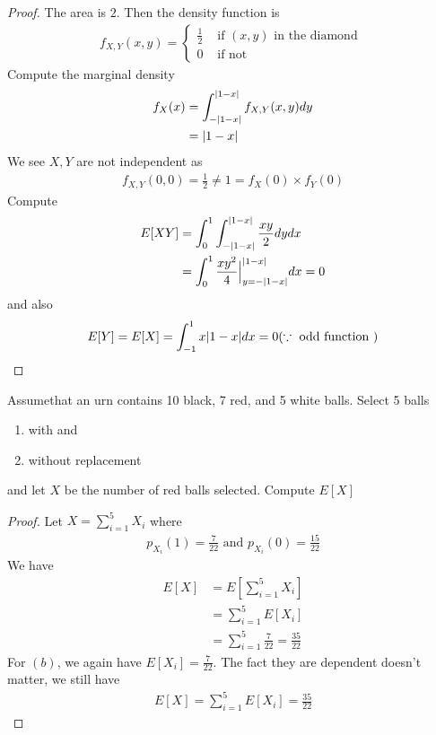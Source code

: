 \documentclass{report}
\begin{document}
\begin{proof}
The area is $2$. Then the density function is 
 \begin{align*}
f_{X,Y}(x,y)=\begin{cases}
  \frac{1}{2}& \text{ if $(x,y)$ in the diamond }\\
  0& \text{ if not }
\end{cases}
\end{align*}
Compute the marginal density 
\begin{align*}
f_X(x)&=\int_{-|1-x|}^{|1-x|} f_{X,Y}(x,y)dy\\
&=|1-x|
\end{align*}
We see $X,Y$ are not independent as 
\begin{align*}
f_{X,Y}(0,0)=\frac{1}{2}\neq 1=f_X(0)\times f_Y(0)
\end{align*}
Compute 
\begin{align*}
E[XY]&=\int_0^1 \int_{-|1-x|}^{|1-x|}\frac{xy}{2}dydx\\
&=\int_0^1 \frac{xy^2}{4}\Big |_{y=-|1-x|}^{|1-x|}dx=0
\end{align*}
and also  
\begin{align*}
E[Y]=E[X]=\int_{-1}^1 x|1-x|dx=0(\because \text{ odd function })
\end{align*}
\end{proof}
\begin{question}{}{}
Assumethat an urn contains 10 black, 7 red, and 5 white balls. Select 5 balls 
\begin{enumerate}[label=(\alph*)]
  \item with and 
  \item without replacement
\end{enumerate}
and let $X$ be the number of red balls selected. Compute $E[X]$
\end{question}
\begin{proof}
Let $X=\sum_{i=1}^5 X_i$ where 
\begin{align*}
p_{X_i}(1)=\frac{7}{22}\text{ and }p_{X_i}(0)=\frac{15}{22}
\end{align*}
We have 
\begin{align*}
E[X]&=E[\sum_{i=1}^5 X_i]\\
&=\sum_{i=1}^5 E[X_i]\\
&=\sum_{i=1}^5 \frac{7}{22}=\frac{35}{22}
\end{align*}
For $(b)$, we again have  $E[X_i]=\frac{7}{22}$. The fact they are dependent doesn't matter, we still have
\begin{align*}
E[X]=\sum_{i=1}^5 E[X_i]=\frac{35}{22}
\end{align*}
\end{proof}
\end{document}
